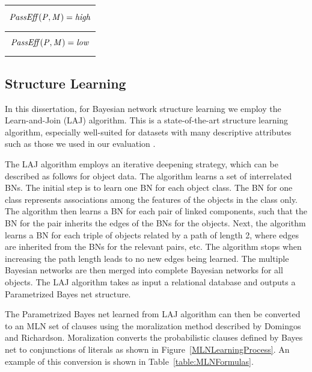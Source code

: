 \begin{table}
{\begin{tabular}{c}
\begin{minipage}{15cm}\begin{equation}\it{PassEff(P,M)}=high \nonumber\end{equation}\end{minipage} \\\hline
\begin{minipage}{15cm}\begin{equation}\it{PassEff(P,M)}=low \nonumber\end{equation}\end{minipage} \\\hline

		\end{tabular}
	}
	
\end{table}
 	\subsection{Structure Learning} In this dissertation, for Bayesian network structure learning we employ the Learn-and-Join (LAJ) algorithm. This is a state-of-the-art structure learning algorithm, especially well-suited for datasets with many descriptive attributes such as those we used in our evaluation \cite{Khosravi2010,Schulte2012}. 
 	
 	 The LAJ algorithm employs an iterative deepening strategy, which can be described as follows for object data. The algorithm learns a set of interrelated BNs. The initial step is to learn one BN for each object class. The BN for one class represents associations among the features of the objects in the class only. The algorithm then learns a BN for
 	 each pair of linked components, such that the BN for the pair inherits the edges of the BNs for the objects.
 	 Next, the algorithm learns a BN for each triple of objects related by a path of length 2, where edges are inherited
 	 from the BNs for the relevant pairs, etc. The algorithm stops when increasing the path length leads to no new
 	 edges being learned. The multiple Bayesian networks are then merged into complete Bayesian networks for
 	 all objects. The LAJ algorithm takes as input a relational database and outputs a Parametrized Bayes net structure.
 	 
 	 The Parametrized Bayes net learned from LAJ algorithm can then be converted to an MLN set of clauses using the moralization method described by Domingos and Richardson\cite{Domingos07}. Moralization converts the probabilistic clauses defined by Bayes net to conjunctions of literals as shown in Figure~\ref{MLNLearningProcess}. An example of this conversion is shown in Table~\ref{table:MLNFormulas}.
 	 
